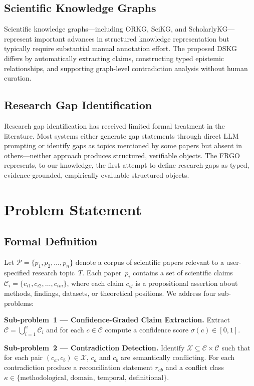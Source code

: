\documentclass{llncs}
\begin{document}
\subsection{Scientific Knowledge Graphs}

Scientific knowledge graphs—including ORKG, SciKG, and ScholarlyKG—represent
important advances in structured knowledge representation but typically require
substantial manual annotation effort. The proposed DSKG differs by automatically
extracting claims, constructing typed epistemic relationships, and supporting
graph-level contradiction analysis without human curation.

\subsection{Research Gap Identification}

Research gap identification has received limited formal treatment in the
literature. Most systems either generate gap statements through direct LLM
prompting or identify gaps as topics mentioned by some papers but absent in
others—neither approach produces structured, verifiable objects. The FRGO
represents, to our knowledge, the first attempt to define research gaps as
typed, evidence-grounded, empirically evaluable structured objects.

\section{Problem Statement}
\label{sec:problem}

\subsection{Formal Definition}

Let $\mathcal{P} = \{p_1, p_2, \ldots, p_n\}$ denote a corpus of scientific
papers relevant to a user-specified research topic~$T$. Each paper~$p_i$
contains a set of scientific claims
$\mathcal{C}_i = \{c_{i1}, c_{i2}, \ldots, c_{im}\}$, where each claim
$c_{ij}$ is a propositional assertion about methods, findings, datasets, or
theoretical positions. We address four sub-problems:

\textbf{Sub-problem~1 — Confidence-Graded Claim Extraction.}
Extract $\mathcal{C} = \bigcup_{i=1}^{n} \mathcal{C}_i$ and for each
$c \in \mathcal{C}$ compute a confidence score $\sigma(c) \in [0,1]$.

\textbf{Sub-problem~2 — Contradiction Detection.}
Identify $\mathcal{X} \subseteq \mathcal{C} \times \mathcal{C}$ such that for
each pair $(c_a, c_b) \in \mathcal{X}$, $c_a$ and $c_b$ are semantically
conflicting. For each contradiction produce a reconciliation statement $r_{ab}$
and a conflict class
$\kappa \in \{\text{methodological},\, \text{domain},\, \text{temporal},\, \text{definitional}\}$.
\end{document}
